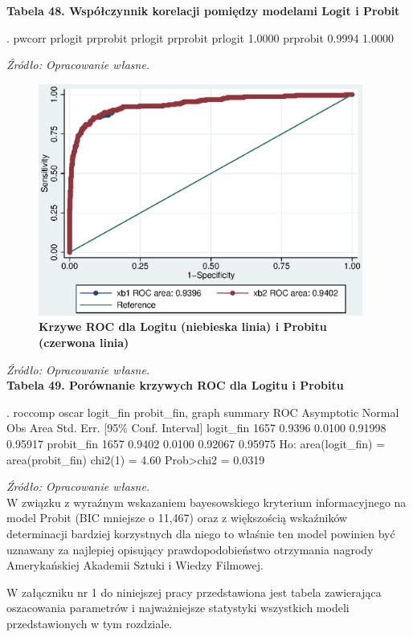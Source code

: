 \vspace{2cm}
\textbf{Tabela 48. Współczynnik korelacji pomiędzy modelami Logit i Probit}
\begin{stlog}
. pwcorr prlogit prprobit 
{\smallskip}
             {\VBAR}  prlogit prprobit
     prlogit {\VBAR}   1.0000 
    prprobit {\VBAR}   0.9994   1.0000 
\end{stlog}
\textit{\footnotesize{Źródło: Opracowanie własne.}} \\

\vspace{0.5cm}
\begin{figure}[h]
\begin{centering}
  \includegraphics[height=3in]{Rysunki//PorownanieROC}
    \caption{\textbf{Krzywe ROC dla Logitu (niebieska linia) i Probitu (czerwona linia)}}
\end{centering}
\end{figure}
\textit{\footnotesize{Źródło: Opracowanie własne.}} \\

\vspace{0.3cm}
\textbf{Tabela 49. Porównanie krzywych ROC dla Logitu i Probitu}
\begin{stlog}
. roccomp oscar logit_fin probit_fin, graph summary
{\smallskip}
                              ROC                    {\DASH}Asymptotic Normal
                   Obs       Area     Std. Err.      [95\% Conf. Interval]
logit_fin         1657     0.9396       0.0100        0.91998     0.95917
probit_fin        1657     0.9402       0.0100        0.92067     0.95975
Ho: area(logit_fin) = area(probit_fin)
    chi2(1) =     4.60       Prob>chi2 =   0.0319
\end{stlog}
\textit{\footnotesize{Źródło: Opracowanie własne.}} \\

W związku z wyraźnym wskazaniem bayesowskiego kryterium informacyjnego na model Probit (BIC mniejsze o 11,467) oraz z większością wskaźników determinacji bardziej korzystnych dla niego to właśnie ten model powinien być uznawany za najlepiej opisujący prawdopodobieństwo otrzymania nagrody Amerykańskiej Akademii Sztuki i Wiedzy Filmowej. 

W załączniku nr 1 do niniejszej pracy przedstawiona jest tabela zawierająca oszacowania parametrów i najważniejsze statystyki wszystkich modeli przedstawionych w tym rozdziale.